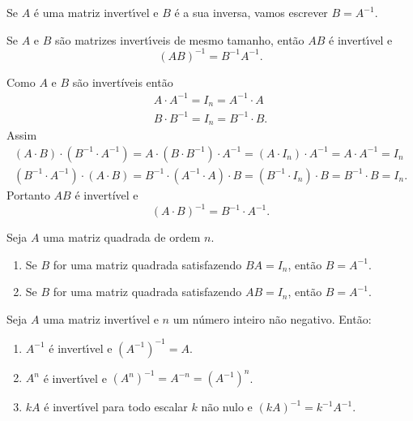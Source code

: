 \begin{notacao}
    Se $A$ \'e uma matriz invert{\'\i}vel e $B$ \'e a sua inversa, vamos escrever $B = A^{-1}$.
\end{notacao}

\begin{proposicao}
    Se $A$ e $B$ s\~ao matrizes invert{\'\i}veis de mesmo tamanho, ent\~ao $AB$ \'e invert{\'\i}vel e
    \[
        (AB)^{-1} = B^{-1} A^{-1}.
    \]
\end{proposicao}
\begin{prova}
    Como $A$ e $B$ são invertíveis então
    \begin{align*}
        A\cdot A^{-1} = I_n = A^{-1}\cdot A\\
        B\cdot B^{-1} = I_n = B^{-1}\cdot B.
    \end{align*}
    Assim
    \begin{align*}
        (A\cdot B)\cdot (B^{-1}\cdot A^{-1}) = A \cdot (B \cdot B^{-1})\cdot A^{-1} = (A \cdot I_n) \cdot A^{-1} = A\cdot A^{-1} = I_n\\
        (B^{-1}\cdot A^{-1}) \cdot (A\cdot B) = B^{-1}\cdot (A^{-1} \cdot A)\cdot B = (B^{-1} \cdot I_n) \cdot B = B^{-1}\cdot B = I_n.
    \end{align*}
    Portanto $AB$ é invertível e
    \[
        (A\cdot B)^{-1} = B^{-1}\cdot A^{-1}.
    \]
\end{prova}

\begin{teorema}
    Seja $A$ uma matriz quadrada de ordem $n$.
    \begin{enumerate}[label={\roman*})]
        \item Se $B$ for uma matriz quadrada satisfazendo $BA = I_n$, então $B = A^{-1}$.
        \item Se $B$ for uma matriz quadrada satisfazendo $AB = I_n$, então $B = A^{-1}$.
    \end{enumerate}
\end{teorema}

\begin{proposicao}
    Seja $A$ uma matriz invert{\'\i}vel e $n$ um n\'umero inteiro n\~ao negativo. Ent\~ao:
    \begin{enumerate}[label={\roman*})]
        \item $A^{-1}$ \'e invert{\'\i}vel e $(A^{-1})^{-1} = A$.

        \item $A^n$ \'e invert{\'\i}vel e $(A^n)^{-1} = A^{-n} = (A^{-1})^n$.

        \item $kA$ \'e invert{\'\i}vel para todo escalar $k$ n\~ao nulo e $(kA)^{-1} = k^{-1}A^{-1}$.
    \end{enumerate}
\end{proposicao}

